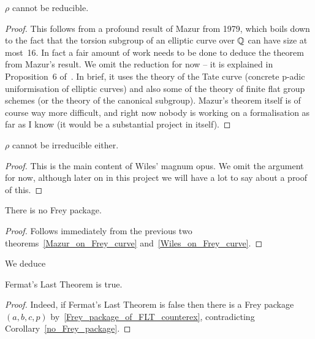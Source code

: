 \begin{theorem}[Mazur]\label{Mazur_on_Frey_curve}\leanok $\rho$ cannot be reducible.\end{theorem}
\begin{proof}\tangled This follows from a profound result of Mazur \cite{mazur} from 1979, which boils down to the fact that the torsion subgroup of an elliptic curve over $\mathbb{Q}$ can have size at most~16. In fact a fair amount of work needs to be done to deduce the theorem from Mazur's result. We omit the reduction for now -- it is explained in Proposition~6 of~\cite{serreconj}. In brief, it uses the theory of the Tate curve (concrete p-adic uniformisation of elliptic curves) and also some of the theory of finite flat group schemes (or the theory of the canonical subgroup). Mazur's theorem itself is of course way more difficult, and right now nobody is working on a formalisation as far as I know (it would be a substantial project in itself).
\end{proof}

\begin{theorem}\label{Wiles_on_Frey_curve}\leanok $\rho$ cannot be irreducible either.\end{theorem}
\begin{proof}\tangled This is the main content of Wiles' magnum opus. We omit the argument for now, although later on in this project we will have a lot to say about a proof of this.
\end{proof}

\begin{corollary}\label{no_Frey_package}\leanok There is no Frey package.\end{corollary}
\begin{proof}\leanok Follows immediately from the previous two theorems~\ref{Mazur_on_Frey_curve} and~\ref{Wiles_on_Frey_curve}.\end{proof}

We deduce

\begin{corollary}\label{FLT}\leanok Fermat's Last Theorem is true.\end{corollary}
\begin{proof}\leanok
Indeed, if Fermat's Last Theorem is false then there is a Frey package $(a,b,c,p)$ by~\ref{Frey_package_of_FLT_counterex}, contradicting Corollary~\ref{no_Frey_package}.
\end{proof}

